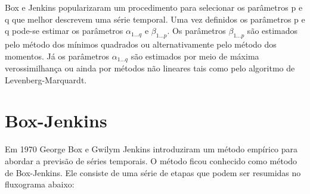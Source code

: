 \documentclass[
	12pt,				%
	openright,			%
	oneside,			%
	a4paper,			%
	english,			%
	french,				%
	spanish,			%
	brazil				%
	]{abntex2}
\begin{document}
Box e Jenkins popularizaram um procedimento para selecionar os parâmetros p e q que melhor descrevem uma série temporal. Uma vez definidos os parâmetros p e q pode-se estimar os parâmetros $\alpha_{1\dots q}$ e $\beta_{1\dots p}$. Os parâmetros $\beta_{1\dots p}$ são estimados pelo método dos mínimos quadrados ou alternativamente pelo  método dos momentos. Já os parâmetros $\alpha_{1\dots q}$ são estimados por meio de máxima verossimilhança ou ainda por métodos não lineares tais como pelo algoritmo de Levenberg-Marquardt.

\chapter{Box-Jenkins}

Em 1970 George Box e Gwilym Jenkins introduziram um método empírico para abordar a previsão de séries temporais. O método ficou conhecido como método de Box-Jenkins. Ele consiste de uma série de etapas que podem ser resumidas no fluxograma abaixo:
\end{document}
